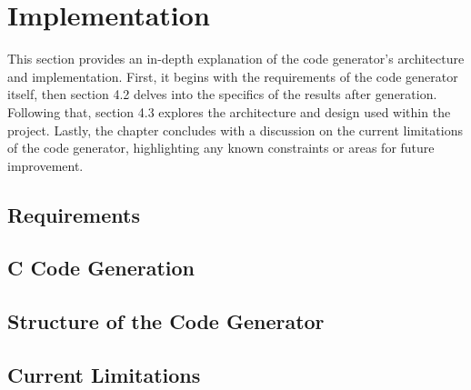 \chapter{Implementation}

This section provides an in-depth explanation of the code generator's architecture and implementation. First, it begins with the requirements of the code generator itself, then section 4.2 delves into the specifics of the results after generation. Following that, section 4.3 explores the architecture and design used within the project. Lastly, the chapter concludes with a discussion on the current limitations of the code generator, highlighting any known constraints or areas for future improvement.

\section{Requirements}



\section{C Code Generation}



\section{Structure of the Code Generator}



\section{Current Limitations}



